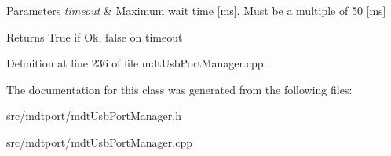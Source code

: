 \begin{DoxyParams}{Parameters}
{\em timeout} & Maximum wait time \mbox{[}ms\mbox{]}. Must be a multiple of 50 \mbox{[}ms\mbox{]} \\
\hline
\end{DoxyParams}
\begin{DoxyReturn}{Returns}
True if Ok, false on timeout 
\end{DoxyReturn}


Definition at line 236 of file mdtUsbPortManager.cpp.



The documentation for this class was generated from the following files:\begin{DoxyCompactItemize}
\item 
src/mdtport/mdtUsbPortManager.h\item 
src/mdtport/mdtUsbPortManager.cpp\end{DoxyCompactItemize}
